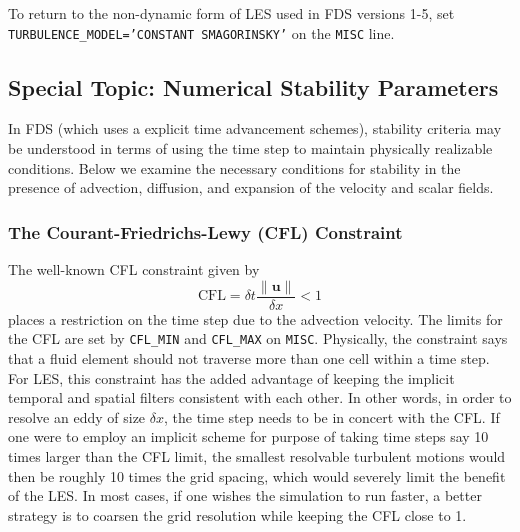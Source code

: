 \documentclass[11pt]{book}
\newcommand{\ct}{\tt\small}
\begin{document}
\begin{warning}
\noindent
To return to the non-dynamic form of LES used in FDS versions 1-5, set {\ct TURBULENCE\_MODEL='CONSTANT SMAGORINSKY'} on the {\ct MISC} line.
\end{warning}


\subsection{Special Topic: Numerical Stability Parameters}
\label{info:CFL}

In FDS (which uses a explicit time advancement schemes), stability criteria may be understood in terms of using the time step to maintain physically realizable conditions.
Below we examine the necessary conditions for stability in the presence of advection, diffusion, and expansion of the velocity and scalar fields.

\subsubsection{The Courant-Friedrichs-Lewy (CFL) Constraint}

The well-known CFL constraint given by
\begin{equation}
\mbox{CFL} = \delta t \frac{\|\mathbf{u}\|}{\delta x} < 1
\end{equation}
places a restriction on the time step due to the advection velocity.  The limits for the CFL are set by {\ct CFL\_MIN} and {\ct CFL\_MAX} on {\ct MISC}.
Physically, the constraint says that a fluid element should not traverse more than one cell within a time step.
For LES, this constraint has the added advantage of keeping the implicit temporal and spatial filters consistent with each other.
In other words, in order to resolve an eddy of size $\delta x$, the time step needs to be in concert with the CFL.
If one were to employ an implicit scheme for purpose of taking time steps say 10 times larger than the CFL limit, the smallest resolvable turbulent motions
would then be roughly 10 times the grid spacing, which would severely limit the benefit of the LES.  In most cases, if one wishes the simulation to run faster,
a better strategy is to coarsen the grid resolution while keeping the CFL close to 1.
\end{document}
